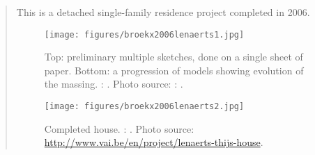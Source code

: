 				

\clearpage
{}
		\begin{quote}
		\small
		This is a detached single-family residence project completed in 2006.		
		\begin{figure}[htb]
		\begin{center}
		\texttt{[image: figures/broekx2006lenaerts1.jpg]}
		\caption{
		Top: preliminary multiple sketches, done on a single sheet of paper.
		Bottom: a progression of models showing evolution of the massing.
		\citeauthor{broekx2006lenaerts}: 
		\cite{broekx2006lenaerts}.
		Photo source: 
		\citeauthor{carusostjohn2005brickhouse}: 
		\cite{bell2010thenewmodernhouse}. 
		}		
		\label{fig:broekx2006lenaerts1}
		\end{center}
		\end{figure}
				
		\begin{figure}[htb]
		\begin{center}
		\texttt{[image: figures/broekx2006lenaerts2.jpg]}
		\caption{
		Completed house.
		\citeauthor{broekx2006lenaerts}: 
		\cite{broekx2006lenaerts}.
		Photo source: \url{http://www.vai.be/en/project/lenaerts-thijs-house}.
		}		
		\label{fig:broekx2006lenaerts2}
		\end{center}
		\end{figure}
		
		\end{quote}
		

